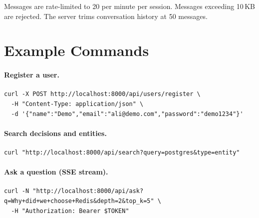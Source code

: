 \begin{warning}
Messages are rate-limited to 20 per minute per session. Messages exceeding
10\,KB are rejected. The server trims conversation history at 50 messages.
\end{warning}

\section{Example  Commands}
\label{sec:api-examples}

\paragraph{Register a user.}
\begin{lstlisting}[style=bash]
curl -X POST http://localhost:8000/api/users/register \
  -H "Content-Type: application/json" \
  -d '{"name":"Demo","email":"ali@demo.com","password":"demo1234"}'
\end{lstlisting}

\paragraph{Search decisions and entities.}
\begin{lstlisting}[style=bash]
curl "http://localhost:8000/api/search?query=postgres&type=entity"
\end{lstlisting}

\paragraph{Ask a question (SSE stream).}
\begin{lstlisting}[style=bash]
curl -N "http://localhost:8000/api/ask?q=Why+did+we+choose+Redis&depth=2&top_k=5" \
  -H "Authorization: Bearer $TOKEN"
\end{lstlisting}
